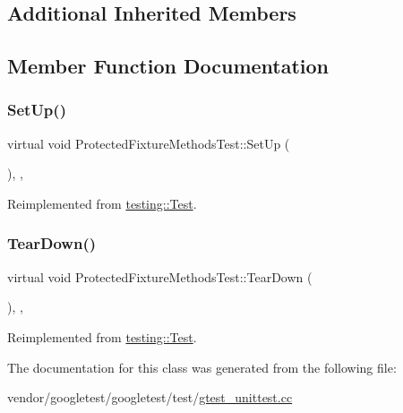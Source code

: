 \subsection*{Additional Inherited Members}


\subsection{Member Function Documentation}
\mbox{\label{class_protected_fixture_methods_test_a5184c708ac89cfb69f0e4c742e93398a}} 
\subsubsection{\texorpdfstring{Set\+Up()}{SetUp()}}
{\footnotesize\ttfamily virtual void Protected\+Fixture\+Methods\+Test\+::\+Set\+Up (\begin{DoxyParamCaption}{ }\end{DoxyParamCaption})\hspace{0.3cm}{\ttfamily [inline]}, {\ttfamily [protected]}, {\ttfamily [virtual]}}



Reimplemented from \hyperlink{classtesting_1_1_test_a190315150c303ddf801313fd1a777733}{testing\+::\+Test}.

\mbox{\label{class_protected_fixture_methods_test_aa143dff0a99903cde207b6fd0042c03c}} 
\subsubsection{\texorpdfstring{Tear\+Down()}{TearDown()}}
{\footnotesize\ttfamily virtual void Protected\+Fixture\+Methods\+Test\+::\+Tear\+Down (\begin{DoxyParamCaption}{ }\end{DoxyParamCaption})\hspace{0.3cm}{\ttfamily [inline]}, {\ttfamily [protected]}, {\ttfamily [virtual]}}



Reimplemented from \hyperlink{classtesting_1_1_test_a5f0ab439802cbe0ef7552f1a9f791923}{testing\+::\+Test}.



The documentation for this class was generated from the following file\+:\begin{DoxyCompactItemize}
\item 
vendor/googletest/googletest/test/\hyperlink{gtest__unittest_8cc}{gtest\+\_\+unittest.\+cc}\end{DoxyCompactItemize}
